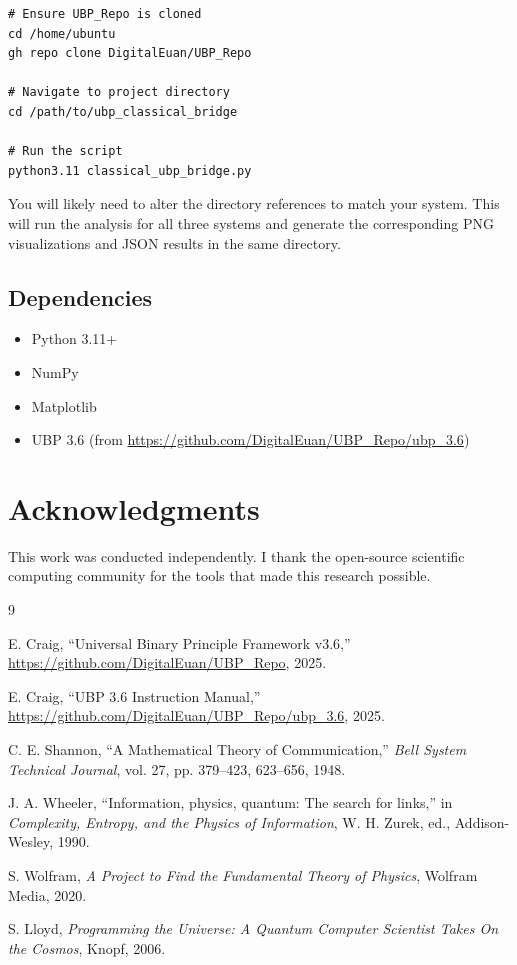 \documentclass[11pt,a4paper]{article}
\begin{document}
\begin{lstlisting}[caption={Reproduce all results}]
# Ensure UBP_Repo is cloned
cd /home/ubuntu
gh repo clone DigitalEuan/UBP_Repo

# Navigate to project directory
cd /path/to/ubp_classical_bridge

# Run the script
python3.11 classical_ubp_bridge.py
\end{lstlisting}

You will likely need to alter the directory references to match your system. This will run the analysis for all three systems and generate the corresponding PNG visualizations and JSON results in the same directory.

\subsection{Dependencies}

\begin{itemize}
    \item Python 3.11+
    \item NumPy
    \item Matplotlib
    \item UBP 3.6 (from \url{https://github.com/DigitalEuan/UBP_Repo/ubp_3.6})
\end{itemize}

\section*{Acknowledgments}

This work was conducted independently. I thank the open-source scientific computing community for the tools that made this research possible.

\begin{thebibliography}{9}

E. Craig, ``Universal Binary Principle Framework v3.6,'' 
\url{https://github.com/DigitalEuan/UBP_Repo}, 2025.

E. Craig, ``UBP 3.6 Instruction Manual,'' 
\url{https://github.com/DigitalEuan/UBP_Repo/ubp_3.6}, 2025.

C. E. Shannon, ``A Mathematical Theory of Communication,'' 
\textit{Bell System Technical Journal}, vol. 27, pp. 379--423, 623--656, 1948.

J. A. Wheeler, ``Information, physics, quantum: The search for links,'' 
in \textit{Complexity, Entropy, and the Physics of Information}, 
W. H. Zurek, ed., Addison-Wesley, 1990.

S. Wolfram, \textit{A Project to Find the Fundamental Theory of Physics}, 
Wolfram Media, 2020.

S. Lloyd, \textit{Programming the Universe: A Quantum Computer Scientist Takes On the Cosmos}, 
Knopf, 2006.

\end{thebibliography}
\end{document}
